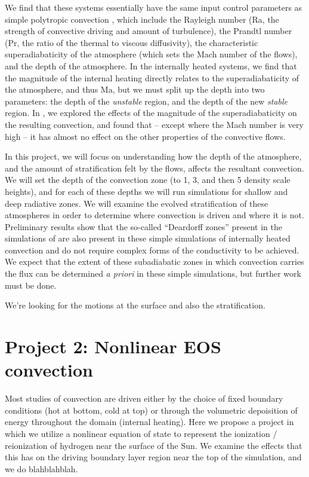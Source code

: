 \documentclass[aasms,12pt]{article}
\begin{document}
We find that these systems essentially have the same input control parameters as simple polytropic
convection \citep{anders&brown2017}, which include the Rayleigh number (Ra, the strength of
convective driving and amount of turbulence), the Prandtl number (Pr, the ratio of the thermal
to viscous diffusivity), the characteristic superadiabaticity of the atmosphere (which sets the Mach
number of the flows), and the depth of the atmosphere.  In the internally heated systems, we
find that the magnitude of the internal heating directly relates to the superadiabaticity of the
atmosphere, and thus Ma, but we must split up the depth into two parameters: the depth of the
\emph{unstable} region, and the depth of the new \emph{stable} region.  In \citealt{anders&brown2017},
we explored the effects of the magnitude of the superadiabaticity on the resulting convection,
and found that -- except where the Mach number is very high -- it has almost no effect on the
other properties of the convective flows.  

In this project, we will focus on understanding how the depth of the atmosphere, and the amount
of stratification felt by the flows, affects the resultant convection.  We will set the depth
of the convection zone (to 1, 3, and then 5 density scale heights), and for each of these depths
we will run simulations for shallow and deep radiative zones.  We will examine the evolved
stratification of these atmospheres in order to determine where convection is driven and where
it is not.  Preliminary results show that the so-called ``Deardorff zones'' present in the
simulations of \citealt{kapyla&all2017} are also present in these simple simulations of
internally heated convection and do not require complex forms of the conductivity to be achieved.
We expect that the extent of these subadiabatic zones in which convection carries the flux can
be determined \emph{a priori} in these simple simulations, but further work must be done.

We're looking for the motions at the surface and also the stratification.

\section{Project 2: Nonlinear EOS convection}
Most studies of convection are driven either by the choice of fixed boundary conditions
(hot at bottom, cold at top) or through the volumetric depoisition of energy throughout
the domain (internal heating).  Here we propose a project in which we utilize a nonlinear
equation of state to represent the ionization / reionization of hydrogen near the surface of
the Sun.  We examine the effects that this has on the driving boundary layer region near the
top of the simulation, and we do blahblahblah.
\end{document}
